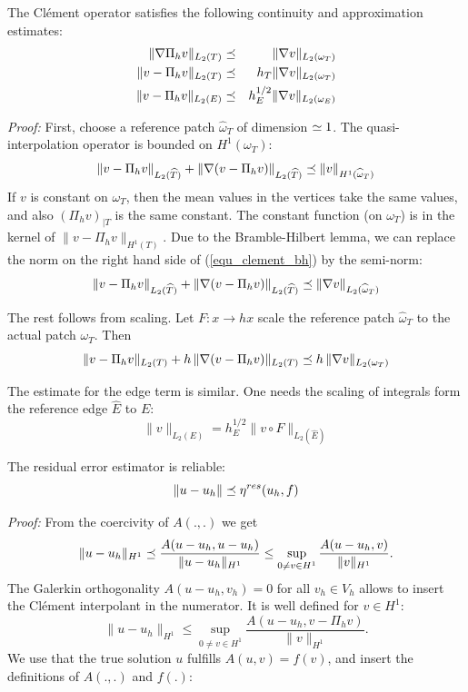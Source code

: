 \bigskip


\begin{theorem} The Cl\'ement operator satisfies the following continuity and
approximation estimates:
\begin{eqnarray*}
\| \nabla \Pi_h v \|_{L_2(T)} & \preceq & \| \nabla v \|_{L_2(\omega_T)} \\
\| v - \Pi_h v \|_{L_2(T)} & \preceq & h_T \| \nabla v \|_{L_2(\omega_T)} \\
\| v - \Pi_h v \|_{L_2(E)} & \preceq & h_E^{1/2} \| \nabla v \|_{L_2(\omega_E)} \\
\end{eqnarray*}
\end{theorem}

{\em Proof:} First, choose a reference patch $\widehat \omega_T$ of 
dimension 
$\simeq 1$. The quasi-interpolation operator is bounded on $H^1(\omega_T)$:
\begin{equation}
\label{equ_clement_bh}
\| v - \Pi_h v \|_{L_2(\widehat T)} + \| \nabla (v - \Pi_h v) \|_{L_2(\widehat T)} \preceq \| v \|_{H^1(\widehat \omega_T)}
\end{equation}
If $v$ is constant on $\omega_T$, then the mean values in the vertices
take the same values, and also $(\Pi_h v)_{|T}$ is the same constant.
The constant function (on $\omega_T$) is in the kernel of 
$\| v - \Pi_h v \|_{H^1(T)}$. Due to
the Bramble-Hilbert lemma, we can replace the norm on the right hand side
of (\ref{equ_clement_bh}) by the semi-norm:
\begin{equation}
\label{equ_clement_bh2}
\| v - \Pi_h v \|_{L_2(\widehat T)} + \| \nabla (v - \Pi_h v) \|_{L_2(\widehat T)} \preceq \| \nabla v \|_{L_2(\widehat \omega_T)}
\end{equation}

The rest follows from scaling. Let $F : x \rightarrow h x$ scale the reference patch $\widehat \omega_T$ to the actual patch $\omega_T$. Then
$$
\| v - \Pi_h v \|_{L_2(T)} + h \, \| \nabla (v-\Pi_h v) \|_{L_2(T)} \preceq h \, \| \nabla v \|_{L_2(\omega_T)}
$$

The estimate for the edge term is similar. One needs the scaling of integrals
form the reference edge $\widehat E$ to $E$:
$$
\| v \|_{L_2(E)} = h_E^{1/2} \| v \circ F \|_{L_2(\hat E)}
$$
\bigskip

\begin{theorem}The residual error estimator is reliable:
$$
\| u - u_h \| \preceq \eta^{res} (u_h, f)
$$
\end{theorem}
{\em Proof:} From the coercivity of $A(.,.)$ we get
$$
\| u - u_h \|_{H^1} \preceq \frac{A(u-u_h, u-u_h)}{ \| u-u_h \|_{H^1} } \leq 
        \sup_{0 \neq v \in H^1} \frac{A(u-u_h, v)}{ \| v \|_{H^1} }.
$$
The Galerkin orthogonality $A(u-u_h,v_h) = 0$ for all $v_h \in V_h$ allows
to insert the Cl\'ement interpolant in the numerator. It is well defined for
$v \in H^1$:
$$
\| u - u_h \|_{H^1} \leq
        \sup_{0 \neq v \in H^1} \frac{A(u-u_h, v - \Pi_h v)}{ \| v \|_{H^1} }.
$$
We use that the true solution $u$ fulfills $A(u,v) = f(v)$, and insert
the definitions of $A(.,.)$ and $f(.)$:

